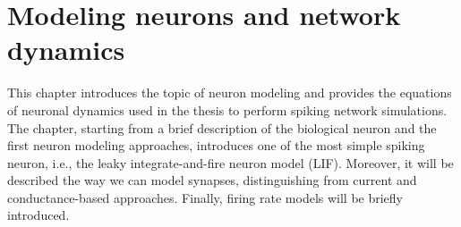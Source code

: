 \documentclass[a4paper, 12pt, twoside, openright]{book}
\begin{document}
\chapter{\textbf{Modeling neurons and network dynamics}}
\label{chapter:lif_adex_intro}
\begin{tcolorbox}[colback=white,colframe=DarkRed,title=\textbf{Summary}]
This chapter introduces the topic of neuron modeling and provides the equations of neuronal dynamics used in the thesis to perform spiking network simulations. The chapter, starting from a brief description of the biological neuron and the first neuron modeling approaches, introduces one of the most simple spiking neuron, i.e., the leaky integrate-and-fire neuron model (LIF). Moreover, it will be described the way we can model synapses, distinguishing from current and conductance-based approaches. Finally, firing rate models will be briefly introduced.
\end{tcolorbox}
\end{document}
